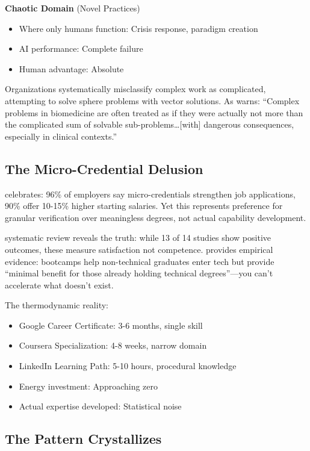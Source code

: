 \textbf{Chaotic Domain} (Novel Practices)
\begin{itemize}
\item Where only humans function: Crisis response, paradigm creation
\item AI performance: Complete failure
\item Human advantage: Absolute
\end{itemize}

Organizations systematically misclassify complex work as complicated, attempting to solve sphere problems with vector solutions. As \citet{kempermann2017} warns: ``Complex problems in biomedicine are often treated as if they were actually not more than the complicated sum of solvable sub-problems\ldots [with] dangerous consequences, especially in clinical contexts.''

\subsection{The Micro-Credential Delusion}

\citet{lumina2025} celebrates: 96\% of employers say micro-credentials strengthen job applications, 90\% offer 10-15\% higher starting salaries. Yet this represents preference for granular verification over meaningless degrees, not actual capability development.

\citet{ha2022} systematic review reveals the truth: while 13 of 14 studies show positive outcomes, these measure satisfaction not competence. \citet{joshi2019} provides empirical evidence: bootcamps help non-technical graduates enter tech but provide ``minimal benefit for those already holding technical degrees''---you can't accelerate what doesn't exist.

The thermodynamic reality:
\begin{itemize}
\item Google Career Certificate: 3-6 months, single skill
\item Coursera Specialization: 4-8 weeks, narrow domain
\item LinkedIn Learning Path: 5-10 hours, procedural knowledge
\item Energy investment: Approaching zero
\item Actual expertise developed: Statistical noise
\end{itemize}

\subsection{The Pattern Crystallizes}

